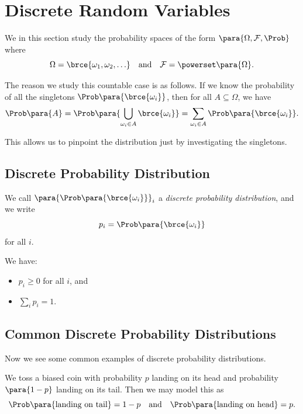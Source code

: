 \section{Discrete Random Variables}

We in this section study the probability spaces of the form \(\para{\Omega, \mathcal{F}, \Prob}\) where
\[
    \Omega = \brce{\omega_1, \omega_2, \ldots} \quad \text{and} \quad \mathcal{F} = \powerset\para{\Omega}.
\]

The reason we study this countable case is as follows. If we know the probability of all the singletons \(\Prob\para{\brce{\omega_i}}\), then for all \(A \subseteq \Omega\), we have
\[
    \Prob\para{A} = \Prob\para{\bigcup_{\omega_i \in A} \brce{\omega_i}} = \sum_{\omega_i \in A} \Prob\para{\brce{\omega_i}}.
\]

This allows us to pinpoint the distribution just by investigating the singletons.

\subsection{Discrete Probability Distribution}

\begin{definition}
    \label{def:discrete-probability-distribution}%
    We call \(\para{\Prob\para{\brce{\omega_i}}}_i\) a \emph{discrete probability distribution}, and we write
    \[
        p_i = \Prob\para{\brce{\omega_i}}
    \]
    for all \(i\).
\end{definition}

We have:
\begin{itemize}
    \item \(p_i \geq 0\) for all \(i\), and
    \item \(\sum_i p_i = 1\).
\end{itemize}

\subsection{Common Discrete Probability Distributions}

Now we see some common examples of discrete probability distributions.

\begin{example}
    \label{ex:tossing-biased-coin}%
    We toss a biased coin with probability \(p\) landing on its head and probability \(\para{1 - p}\) landing on its tail. Then we may model this as
    \[
        \Prob\para{\text{landing on tail}} = 1 - p \quad \text{and} \quad \Prob\para{\text{landing on head}} = p.
    \]
\end{example}

